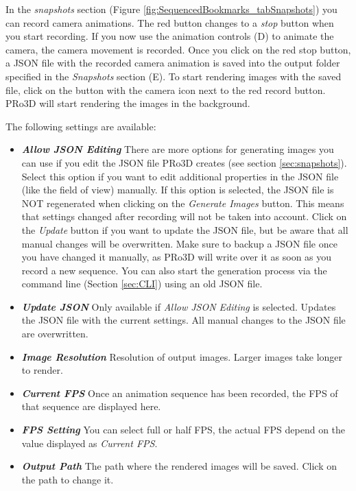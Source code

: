 In the \emph{snapshots} section (Figure \ref{fig:SequencedBookmarks_tabSnapshots}) you can record camera animations. The red button changes to a \emph{stop} button when you start recording. If you now use the animation controls (D) to animate the camera, the camera movement is recorded. Once you click on the red stop button, a JSON file with the recorded camera animation is saved into the output folder specified in the \emph{Snapshots} section (E). To start rendering images with the saved file, click on the button with the camera icon next to the red record button. PRo3D will start rendering the images in the background.

The following settings are available:
\begin{itemize}
	\item \textbf{\emph{Allow JSON Editing}} There are more options for generating images you can use if you edit the JSON file PRo3D creates (see section \ref{sec:snapshots}). Select this option if you want to edit additional properties in the JSON file (like the field of view) manually. If this option is selected, the JSON file is NOT regenerated when clicking on the \emph{Generate Images} button. This means that settings changed after recording will not be taken into account. Click on the \emph{Update} button if you want to update the JSON file, but be aware that all manual changes will be overwritten. Make sure to backup a JSON file once you have changed it manually, as PRo3D will write over it as soon as you record a new sequence. You can also start the generation process via the command line (Section \ref{sec:CLI}) using an old JSON file. 
	\item \textbf{\emph{Update JSON}} Only available if \emph{Allow JSON Editing} is selected. Updates the JSON file with the current settings. All manual changes to the JSON file are overwritten. 
	\item \textbf{\emph{Image Resolution}} Resolution of output images. Larger images take longer to render.
	\item \textbf{\emph{Current FPS}} Once an animation sequence has been recorded, the FPS of that sequence are displayed here.
	\item \textbf{\emph{FPS Setting}} You can select full or half FPS, the actual FPS depend on the value displayed as \emph{Current FPS}. 
	\item \textbf{\emph{Output Path}} The path where the rendered images will be saved. Click on the path to change it.
\end{itemize}

